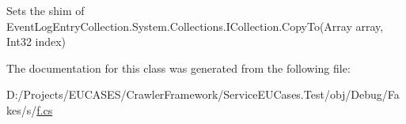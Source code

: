 Sets the shim of Event\-Log\-Entry\-Collection.\-System.\-Collections.\-I\-Collection.\-Copy\-To(\-Array array, Int32 index)



The documentation for this class was generated from the following file\-:\begin{DoxyCompactItemize}
\item 
D\-:/\-Projects/\-E\-U\-C\-A\-S\-E\-S/\-Crawler\-Framework/\-Service\-E\-U\-Cases.\-Test/obj/\-Debug/\-Fakes/s/\hyperlink{s_2f_8cs}{f.\-cs}\end{DoxyCompactItemize}
